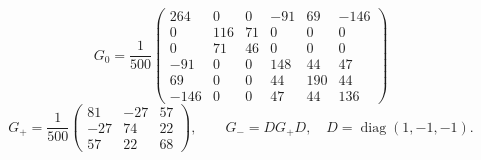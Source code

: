 \[
G_0=\frac1{500}\begin{pmatrix}
264 & 0 & 0 & -91 & 69 & -146 \\
0 & 116 & 71 & 0 & 0 & 0 \\
0 & 71 & 46 & 0 & 0 & 0 \\
-91 & 0 & 0 & 148 & 44 & 47 \\
69 & 0 & 0 & 44 & 190 & 44 \\
-146 & 0 & 0 & 47 & 44 & 136
\end{pmatrix}
\]
\[
G_+=\frac1{500}\begin{pmatrix}
81 & -27 & 57 \\
-27 & 74 & 22 \\
57 & 22 & 68
\end{pmatrix},\qquad G_-=DG_+D,\quad D=\operatorname{diag}(1,-1,-1).
\]
